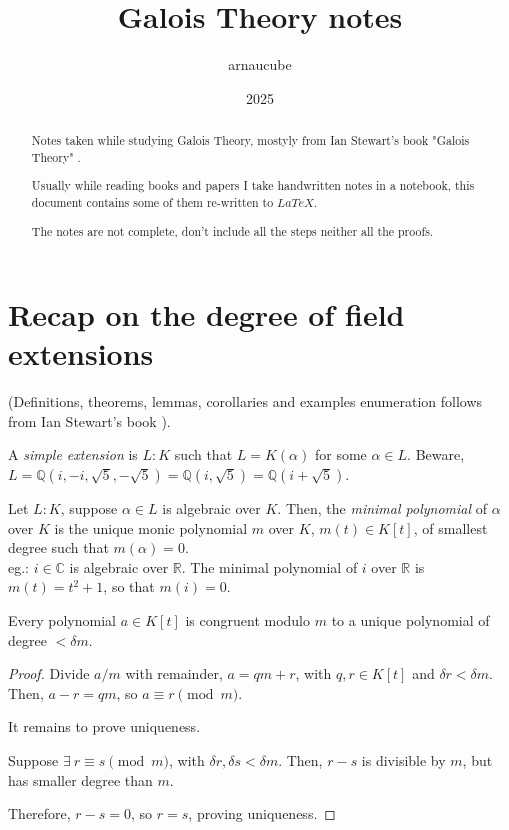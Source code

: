\documentclass{article}
\title{Galois Theory notes}
\author{arnaucube}
\date{2025}
\theoremstyle{definition}
\newenvironment{defn}[1]
{\renewcommand\theinnerdefn{#1}\innerdefn}
{\endinnerdefn}
\newenvironment{lemma}[1]
{\renewcommand\theinnerlemma{#1}\innerlemma}
{\endinnerlemma}
\newenvironment{eg}[1]
{\renewcommand\theinnereg{#1}\innereg}
{\endinnereg}
\begin{document}
\maketitle

\begin{abstract}
	Notes taken while studying Galois Theory, mostyly from Ian Stewart's book "Galois Theory" \cite{ianstewart}.

	Usually while reading books and papers I take handwritten notes in a notebook, this document contains some of them re-written to $LaTeX$.

	The notes are not complete, don't include all the steps neither all the proofs.
\end{abstract}

\tableofcontents

\section{Recap on the degree of field extensions}
(Definitions, theorems, lemmas, corollaries and examples enumeration follows from Ian Stewart's book \cite{ianstewart}).

\begin{defn}{4.10}
  A \emph{simple extension} is $L:K$ such that $L=K(\alpha)$ for some $\alpha \in L$.
\end{defn}
\begin{eg}{4.11}
  Beware, $L=\mathbb{Q}(i, -i, \sqrt{5}, -\sqrt{5}) = \mathbb{Q}(i, \sqrt{5}) = \mathbb{Q}(i+\sqrt{5})$.
\end{eg}

\begin{defn}{5.5}
  Let $L:K$, suppose $\alpha \in L$ is algebraic over $K$. Then, the \emph{minimal polynomial} of $\alpha$ over $K$ is the unique monic polynomial $m$ over $K$, $m(t) \in K[t]$, of smallest degree such that $m(\alpha)=0$.
  \\
  eg.: $i \in \mathbb{C}$ is algebraic over $\mathbb{R}$. The minimal polynomial of $i$ over $\mathbb{R}$ is $m(t)=t^2 +1$, so that $m(i)=0$.
\end{defn}

\begin{lemma}{5.9}
  Every polynomial $a \in K[t]$ is congruent modulo $m$ to a unique polynomial of degree $< \delta m$.
\end{lemma}
\begin{proof}
  Divide $a / m$ with remainder, $a= qm +r$, with $q,r \in K[t]$ and $\delta r < \delta m$.
  Then, $a-r=qm$, so $a \equiv r \pmod{m}$.

  It remains to prove uniqueness.

  Suppose $\exists~ r \equiv s \pmod{m}$, with $\delta r, \delta s < \delta m$.
  Then, $r-s$ is divisible by $m$, but has smaller degree than $m$.

  Therefore, $r-s=0$, so $r=s$, proving uniqueness.
\end{proof}
\end{document}
